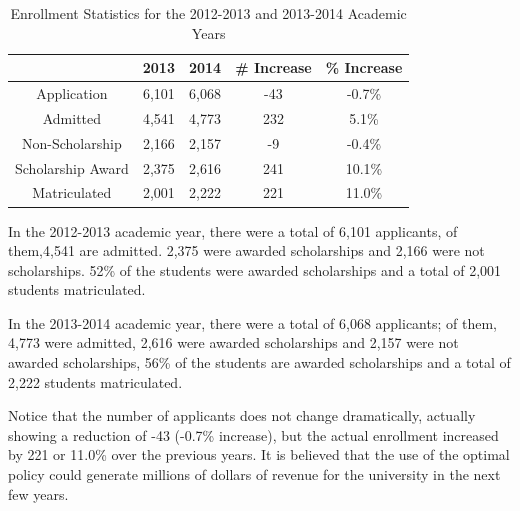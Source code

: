 \documentclass[12pt,english]{report}
\begin{document}
\begin{table}[ht!]
\centering
\begin{tabular}{|c|c|c|c|c|}
\hline
& 2013 & 2014 & \# Increase & \% Increase \\ \hline
Application                    & 6,101 & 6,068 & -43         & -0.7\%      \\
\hline
Admitted                       & 4,541 & 4,773 & 232         & 5.1\%       \\
\hline
Non-Scholarship                & 2,166 & 2,157 & -9          & -0.4\%      \\
\hline
Scholarship Award              & 2,375 & 2,616 & 241         & 10.1\%      \\
\hline
Matriculated                   & 2,001 & 2,222 & 221         & 11.0\%      \\
\hline
\end{tabular}
\caption{Enrollment Statistics for the 2012-2013 and 2013-2014 Academic Years}
\label{enroll_stats}

\end{table}

In the 2012-2013 academic year, there were a total of 6,101 applicants, of
them,4,541   are admitted. 2,375 were awarded scholarships and 2,166 were not
scholarships. 52\% of the students were awarded scholarships and a total of
2,001 students matriculated.

In the 2013-2014 academic year, there were a total of 6,068 applicants; of
them, 4,773 were admitted, 2,616 were awarded scholarships and 2,157 were not
awarded scholarships, 56\% of the students are awarded scholarships and a total
of 2,222 students matriculated.

Notice that the number of applicants does not change dramatically, actually
showing a reduction of -43 (-0.7\% increase), but the actual enrollment
increased by 221  or 11.0\% over the previous years.  It is believed that the
use of the optimal policy could generate millions of dollars of revenue for the
university in the next few years.
\end{document}

